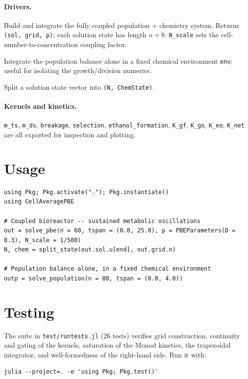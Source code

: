 \documentclass[11pt,a4paper]{article}
\begin{document}
\paragraph{Drivers.}
\begin{description}[leftmargin=1.5em, style=nextline]
\item[\texttt{solve\_pbe(; n, tspan, p, N\_scale, \ldots)}] Build and integrate the fully coupled
population + chemistry system. Returns \texttt{(sol, grid, p)}; each solution state has length
$n + 8$. \texttt{N\_scale} sets the cell-number-to-concentration coupling factor.
\item[\texttt{solve\_population(; n, tspan, env, N0, \ldots)}] Integrate the population balance alone
in a fixed chemical environment \texttt{env}; useful for isolating the growth/division numerics.
\item[\texttt{split\_state(u, n)}] Split a solution state vector into \texttt{(N, ChemState)}.
\end{description}

\paragraph{Kernels and kinetics.} \texttt{m\_ts}, \texttt{m\_ds}, \texttt{breakage},
\texttt{selection}, \texttt{ethanol\_formation}, \texttt{K\_gf}, \texttt{K\_go}, \texttt{K\_eo},
\texttt{K\_net} are all exported for inspection and plotting.

\section{Usage}
\begin{lstlisting}
using Pkg; Pkg.activate("."); Pkg.instantiate()
using CellAveragePBE

# Coupled bioreactor -- sustained metabolic oscillations
out = solve_pbe(n = 60, tspan = (0.0, 25.0), p = PBEParameters(D = 0.3), N_scale = 1/500)
N, chem = split_state(out.sol.u[end], out.grid.n)

# Population balance alone, in a fixed chemical environment
outp = solve_population(n = 80, tspan = (0.0, 4.0))
\end{lstlisting}

\section{Testing}
The suite in \texttt{test/runtests.jl} (26 tests) verifies grid construction, continuity and gating of
the kernels, saturation of the Monod kinetics, the trapezoidal integrator, and well-formedness of the
right-hand side. Run it with:
\begin{lstlisting}
julia --project=. -e 'using Pkg; Pkg.test()'
\end{lstlisting}
\end{document}
